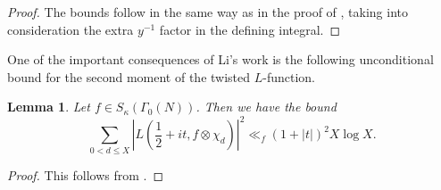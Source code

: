 \documentclass[12pt]{amsart}
\newtheorem{lemma}[theorem]{Lemma}
\def\log{\operatorname{log}}
\begin{document}
\begin{proof}
    The bounds follow in the same way as in the proof of \cite[Proposition 5.4]{Iwk}, taking into consideration the extra $y^{-1}$ factor in the defining integral.
\end{proof}
One of the important consequences of Li's work \cite{XLi} is the following unconditional bound for the second moment of the twisted $L$-function.
\begin{lemma}\label{XLi_bound}
Let $f\in S_{\kappa}(\Gamma_0(N))$. Then we have the bound
    $$\sum_{0<d\leq X} \left|L\left(\frac{1}{2}+it , f \otimes \chi_d \right)\right|^2 \ll_f (1+|t|)^{2}X \log X .$$
\end{lemma}
\begin{proof}
    This follows from \cite[Proof of Theorem 1.1]{XLi}.
\end{proof}
\end{document}

